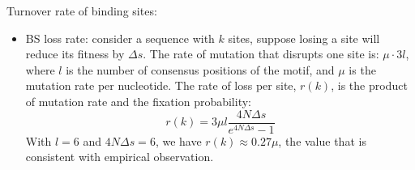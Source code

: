 \documentclass[11pt]{article}
\begin{document}
\begin{enumerate}
Turnover rate of binding sites: 
\begin{itemize}
\item BS loss rate: consider a sequence with $k$ sites, suppose losing a site will reduce its fitness by $\Delta s$. The rate of mutation that disrupts one site is: $\mu \cdot 3 l$, where $l$ is the number of consensus positions of the motif, and $\mu$ is the mutation rate per nucleotide. The rate of loss per site, $r(k)$, is the product of mutation rate and the fixation probability:  
\begin{equation}
r(k) = 3 \mu l \frac{4N\Delta s}{e^{4N\Delta s} - 1}	
\end{equation}
With $l = 6$ and $4 N \Delta s = 6$, we have $r(k) \approx 0.27 \mu$, the value that is consistent with empirical observation. 

\end{itemize}

\end{enumerate}
\end{document}
